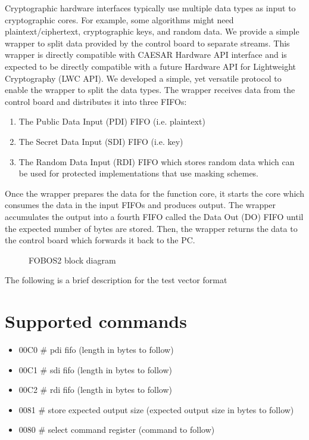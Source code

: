 \documentclass[letterpaper,10pt,english]{sphinxmanual}
\let\sphinxpxdimen\pdfpxdimen\else\newdimen\sphinxpxdimen
\begin{document}
Cryptographic hardware interfaces typically use multiple data types as input to cryptographic cores.
For example, some algorithms might need plaintext/ciphertext, cryptographic keys, and random data.
We provide a simple wrapper to split data provided by the control board to separate streams.
This wrapper is directly compatible with CAESAR Hardware API interface and is expected to be directly compatible with a future Hardware API for Lightweight Cryptography (LWC API).
We developed a simple, yet versatile protocol to enable the wrapper to split the data types.
The wrapper receives data from the control board and distributes it into three FIFOs:
\begin{enumerate}
\def\theenumi{\arabic{enumi}}
\def\labelenumi{\theenumi .}
\makeatletter\def\p@enumii{\p@enumi \theenumi .}\makeatother
\item {} 
The Public Data Input (PDI) FIFO (i.e. plaintext)

\item {} 
The Secret Data Input (SDI) FIFO (i.e. key)

\item {} 
The Random Data Input (RDI) FIFO which stores random data which can be used for protected implementations that use masking schemes.

\end{enumerate}

Once the wrapper prepares the data for the function core, it starts the core which consumes the data in the input FIFOs and produces output.
The wrapper accumulates the output into a fourth FIFO called the Data Out (DO) FIFO until the expected number of bytes are stored.
Then, the wrapper returns the data to the control board which forwards it back to the PC.

\begin{figure}[htbp]
\centering
\capstart

\noindent\sphinxincludegraphics[height=300\sphinxpxdimen]{{fobos2-block}.png}
\caption{FOBOS2 block diagram}\label{\detokenize{tvgen:id1}}\end{figure}

The following is a brief description for the test vector format


\section{Supported commands}
\label{\detokenize{tvgen:supported-commands}}\begin{itemize}
\item {} 
00C0 \# pdi fifo (length in bytes to follow)

\item {} 
00C1 \# sdi fifo (length in bytes to follow)

\item {} 
00C2 \# rdi fifo (length in bytes to follow)

\item {} 
0081 \# store expected output size (expected output size in bytes to follow)

\item {} 
0080 \# select command register (command to follow)

\end{itemize}
\end{document}

